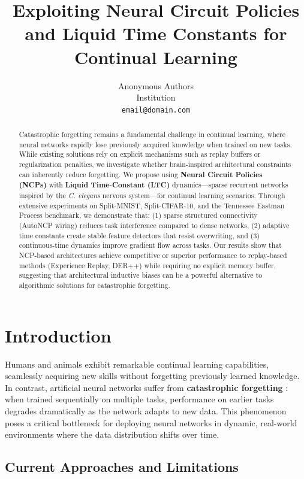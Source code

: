 \documentclass[11pt,twocolumn]{article}
\title{Exploiting Neural Circuit Policies and Liquid Time Constants for Continual Learning}
\author{
  Anonymous Authors \\
  Institution \\
  \texttt{email@domain.com}
}
\date{}
\begin{document}
\maketitle

\begin{abstract}
Catastrophic forgetting remains a fundamental challenge in continual learning, where neural networks rapidly lose previously acquired knowledge when trained on new tasks. While existing solutions rely on explicit mechanisms such as replay buffers or regularization penalties, we investigate whether brain-inspired architectural constraints can inherently reduce forgetting. We propose using \textbf{Neural Circuit Policies (NCPs)} with \textbf{Liquid Time-Constant (LTC)} dynamics—sparse recurrent networks inspired by the \textit{C. elegans} nervous system—for continual learning scenarios. Through extensive experiments on Split-MNIST, Split-CIFAR-10, and the Tennessee Eastman Process benchmark, we demonstrate that: (1) sparse structured connectivity (AutoNCP wiring) reduces task interference compared to dense networks, (2) adaptive time constants create stable feature detectors that resist overwriting, and (3) continuous-time dynamics improve gradient flow across tasks. Our results show that NCP-based architectures achieve competitive or superior performance to replay-based methods (Experience Replay, DER++) while requiring no explicit memory buffer, suggesting that architectural inductive biases can be a powerful alternative to algorithmic solutions for catastrophic forgetting.
\end{abstract}

\section{Introduction}

Humans and animals exhibit remarkable continual learning capabilities, seamlessly acquiring new skills without forgetting previously learned knowledge. In contrast, artificial neural networks suffer from \textbf{catastrophic forgetting} \cite{mccloskey1989catastrophic, french1999catastrophic}: when trained sequentially on multiple tasks, performance on earlier tasks degrades dramatically as the network adapts to new data. This phenomenon poses a critical bottleneck for deploying neural networks in dynamic, real-world environments where the data distribution shifts over time.

\subsection{Current Approaches and Limitations}
\end{document}
